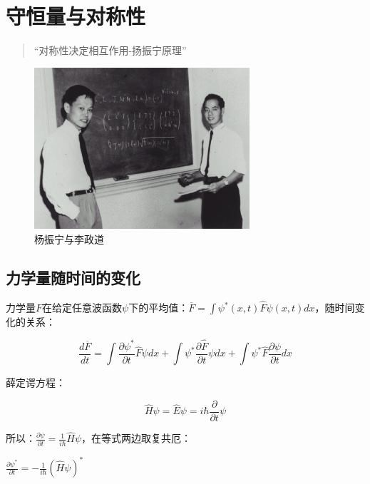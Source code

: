 \section{守恒量与对称性}

\begin{quotation}
``对称性决定相互作用-扬振宁原理''
\end{quotation}

\begin{figure}[h]
\begin{center}
\includegraphics[clip,width=8cm]{Symmetry/yang-lee.ps}
\caption{杨振宁与李政道}
\end{center}
\end{figure}

\subsection{力学量随时间的变化}

力学量$F$在给定任意波函数$\psi$下的平均值：$\overline F  = \int {\psi ^* (x,t)\widehat F\psi (x,t)dx} $，随时间变化的关系：

\begin{equation}\label{16-1}
\frac{{d\overline F }}{{dt}} = \int {\frac{{\partial \psi ^* }}{{\partial t}}} \widehat F\psi dx + \int {\psi ^* \frac{{\partial \widehat F}}{{\partial t}}\psi dx}  + \int {\psi ^* \widehat F\frac{{\partial \psi }}{{\partial t}}dx}
\end{equation}

薛定谔方程：

\begin{equation}\label{16-2}
\widehat H\psi  = \widehat E\psi  = i\hbar \frac{\partial }{{\partial t}}\psi
\end{equation}

所以：$\frac{{\partial \psi }}{{\partial t}} = \frac{1}{{i\hbar }}\widehat H\psi $，在等式两边取复共厄：

\begin{center}
$\frac{{\partial \psi ^* }}{{\partial t}} =  - \frac{1}{{i\hbar }}\left( {\widehat H\psi } \right)^* $
\end{center}


